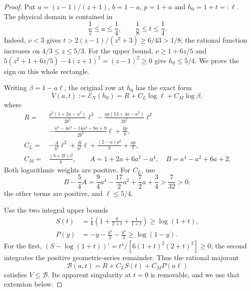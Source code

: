 \begin{proof}
Put $a=(z-1)/(z+1)$, $b=1-a$, $p=1+a$ and $h_0=1+t=:\ell$.
The physical domain is contained in
\[
 \frac17\leq a\leq\frac14,\qquad \frac18\leq t\leq\frac14.
\]
Indeed, $\nu<3$ gives
$t>2(z-1)/(z^2+3)\geq6/43>1/8$; the rational function increases
on $4/3\leq z\leq5/3$. For the upper bound, $\nu\ge1+6z/5$ and
$5(z^2+1+6z/5)-4(z+1)^2=(z-1)^2\ge0$ give $h_0\le5/4$.
We prove the sign on this whole rectangle.

Writing $\beta=1-a\ell$, the original row at $h_0$ has the exact form
\[
 V(a,t):=\mathcal E_N(h_0)=R+C_L\log\ell+C_M\log\beta,
\]
where
\begin{align*}
 R={}&\frac{p^3(1+2a-a^2)}{2b^2}\ell^3
      -\frac{ap(13+4a-a^2)}{2b^2}\ell^2\\
    &-\frac{a^4-4a^3-14a^2-8a+9}{2b^2}\ell+\frac{4p}b,\\
 C_L={}&-\frac{A}{b^2}\ell^2+\frac{B}{b^2}\ell
                   +\frac{(2-a)p^2}b+\frac{ap}t,\\
 C_M={}&\frac{(b+2t)\beta}b,\qquad
 A=1+2a+6a^2-a^4,\quad B=a^4-a^2+6a+2.
\end{align*}
Both logarithmic weights are positive. For $C_L$, use
\[
 B-\frac54A
 =\frac94a^4-\frac{17}2a^2+\frac72a+\frac34>\frac7{32}>0;
\]
the other terms are positive, and $\ell\leq5/4$.

Use the two integral upper bounds
\begin{align*}
 S(t)&=\frac t6\left(1+\frac8{2+t}+\frac1{1+t}\right)\geq\log(1+t),\\
 P(y)&=-y-\frac{y^2}2-\frac{y^3}3\geq\log(1-y).
\end{align*}
For the first, $(S-\log(1+t))'=t^4/[6(1+t)^2(2+t)^2]\geq0$;
the second integrates the positive geometric-series remainder.
Thus the rational majorant
\[
 \mathcal B(a,t)=R+C_LS(t)+C_MP(a\ell)
\]
satisfies $V\leq\mathcal B$. Its apparent singularity at $t=0$ is
removable, and we use that extension below.


\end{proof}
